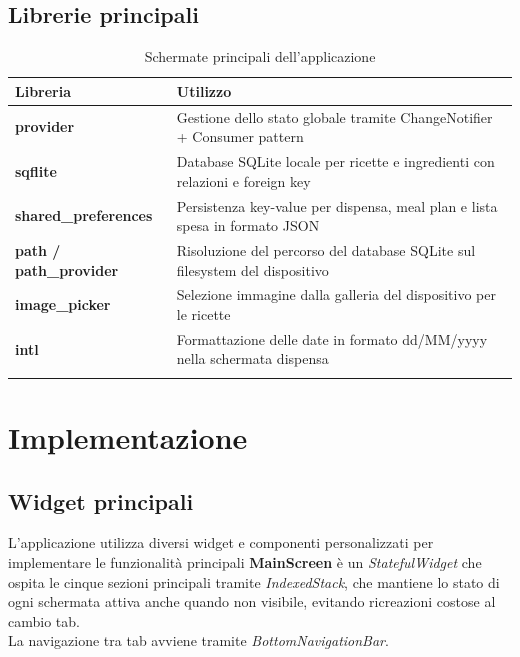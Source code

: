 \documentclass[a4paper, 12pt]{article}
\begin{document}
\subsection{Librerie principali}

\begin{table}[H]
    \centering
    \renewcommand{\arraystretch}{1.5}
    \begin{tabularx}{\textwidth}{@{} >{\bfseries}l X @{}}
        \toprule
        \textbf{Libreria} & \textbf{Utilizzo} \\
        
        \midrule
        provider & Gestione dello stato globale tramite ChangeNotifier + Consumer pattern \\
        \addlinespace
        sqflite & Database SQLite locale per ricette e ingredienti con relazioni e foreign key \\
        \addlinespace
        shared\_preferences & Persistenza key-value per dispensa, meal plan e lista spesa in formato JSON \\
        \addlinespace
        path / path\_provider & Risoluzione del percorso del database SQLite sul filesystem del dispositivo \\
        \addlinespace
        image\_picker & Selezione immagine dalla galleria del dispositivo per le ricette \\
        \addlinespace
        intl & Formattazione delle date in formato dd/MM/yyyy nella schermata dispensa \\
        \addlinespace
        
        \bottomrule
    \end{tabularx}
    \caption{Schermate principali dell'applicazione}
    \label{tab:requisiti_sistema}

\end{table}

\newpage
\section{Implementazione}


\subsection{Widget principali}
L’applicazione utilizza diversi widget e componenti personalizzati per implementare le funzionalità principali
\newline
\textbf{MainScreen} è un \textit{StatefulWidget} che ospita le cinque sezioni principali tramite \textit{IndexedStack}, che mantiene lo stato di ogni schermata attiva anche quando non visibile, evitando ricreazioni costose al cambio tab. \\
La navigazione tra tab avviene tramite \textit{BottomNavigationBar}.\\
\end{document}
